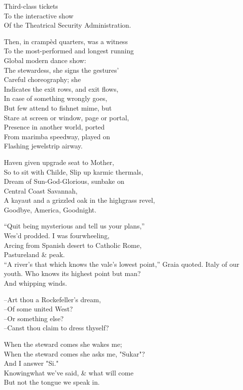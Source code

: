 Third-class tickets \\
To the interactive show \\
Of the Theatrical Security Administration.

Then, in crampèd quarters, was a witness \\
To the most-performed and longest running \\
Global modern dance show: \\
The stewardess, she signs the gestures' \\
Careful choreography; she \\
Indicates the exit rows, and exit flows, \\
In case of something wrongly goes, \\ 
But few attend to fishnet mime, but \\
Stare at screen or window, page or portal, \\
Presence in another world, ported \\
From marimba speedway, played on \\
Flashing jewelstrip airway.

Haven given upgrade seat to Mother, \\
So to sit with Childe, Slip up karmic thermals, \\ 
Dream of Sun-God-Glorious, sunbake on \\
Central Coast Savannah, \\
A kayaut and a grizzled oak in the highgrass revel, \\
Goodbye, America, Goodnight.

``Quit being mysterious and tell us your plans,'' \\
Wes'd prodded. I was fourwheeling, \\
Arcing from Spanish desert to Catholic Rome, \\
Pastureland \& peak. \\
``A river's that which knows the vale's lowest point,'' 
Graia quoted. Italy of our youth. Who knows its highest point but man? \\
And whipping winds.

--Art thou a Rockefeller's dream, \\
--Of some united West? \\
--Or something else? \\
--Canst thou claim to dress thyself?

When the steward comes she wakes me; \\
When the steward comes she asks me, "Sukar"? \\
And I answer "Si." \\
Knowingwhat we've said, \& what will come \\
But not the tongue we speak in.